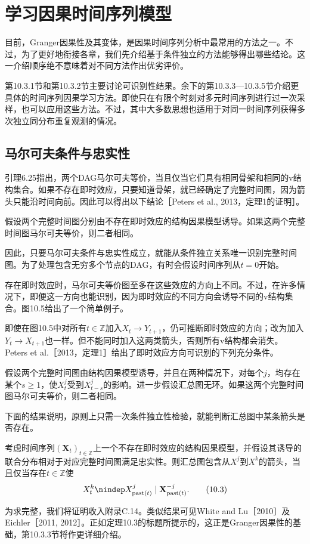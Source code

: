 \section{学习因果时间序列模型}
目前，Granger因果性及其变体，是因果时间序列分析中最常用的方法之一。不过，为了更好地衔接各章，我们先介绍基于条件独立的方法能够得出哪些结论。这一介绍顺序绝不意味着对不同方法作出优劣评价。

第10.3.1节和第10.3.2节主要讨论可识别性结果。余下的第10.3.3—10.3.5节介绍更具体的时间序列因果学习方法。即使只在有限个时刻对多元时间序列进行过一次采样，也可以应用这些方法。不过，其中大多数思想也适用于对同一时间序列获得多次独立同分布重复观测的情况。

\subsection{马尔可夫条件与忠实性}
引理6.25指出，两个DAG马尔可夫等价，当且仅当它们具有相同骨架和相同的v结构集合。如果不存在即时效应，只要知道骨架，就已经确定了完整时间图，因为箭头只能沿时间向前。因此可以得出以下结论［Peters et al., 2013，定理1的证明］。
\begin{theorem}[不存在即时效应时的可识别性]
假设两个完整时间图分别由不存在即时效应的结构因果模型诱导。如果这两个完整时间图马尔可夫等价，则二者相同。
\end{theorem}

因此，只要马尔可夫条件与忠实性成立，就能从条件独立关系唯一识别完整时间图。为了处理包含无穷多个节点的DAG，有时会假设时间序列从$t=0$开始。

存在即时效应时，马尔可夫等价图至多在这些效应的方向上不同。不过，在许多情况下，即便这一方向也能识别，因为即时效应的不同方向会诱导不同的v结构集合。图10.5给出了一个简单例子。


即使在图10.5中对所有$t\in\mathbb Z$加入$X_t\to Y_{t+1}$，仍可推断即时效应的方向；改为加入$Y_t\to X_{t+1}$也一样。但不能同时加入这两类箭头，否则所有v结构都会消失。Peters et al.［2013，定理1］给出了即时效应方向可识别的下列充分条件。
\begin{theorem}[汇总图无环时的可识别性]
假设两个完整时间图由结构因果模型诱导，并且在两种情况下，对每个$j$，均存在某个$s\ge1$，使$X_t^j$受到$X_{t-s}^j$的影响。进一步假设汇总图无环。如果这两个完整时间图马尔可夫等价，则二者相同。
\end{theorem}

下面的结果说明，原则上只需一次条件独立性检验，就能判断汇总图中某条箭头是否存在。
\begin{theorem}[Granger因果性的依据]
考虑时间序列$(\mathbf X_t)_{t\in\mathbb Z}$上一个不存在即时效应的结构因果模型，并假设其诱导的联合分布相对于对应完整时间图满足忠实性。则汇总图包含从$X^j$到$X^k$的箭头，当且仅当存在$t\in\mathbb Z$使
\begin{equation}
 X_t^k\nindep X_{\mathrm{past}(t)}^j\mid\mathbf X_{\mathrm{past}(t)}^{-j}.
 \tag{10.3}
\end{equation}
\end{theorem}
为求完整，我们将证明收入附录C.14。类似结果可见White and Lu［2010］及Eichler［2011, 2012］。正如定理10.3的标题所提示的，这正是Granger因果性的基础，第10.3.3节将作更详细介绍。

